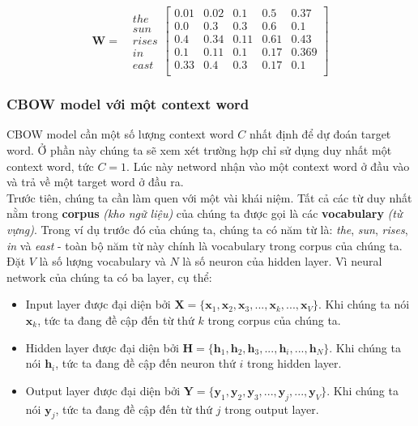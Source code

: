 \documentclass[12pt]{article}
\newcommand{\itemsizePaddingLeft}{\setlength{\itemindent}{0.6cm}}
\begin{document}
$$\boldsymbol{W} = \text{ } \begin{matrix} the \\ sun \\ rises \\ in \\ east \end{matrix} \begin{bmatrix} 0.01 & 0.02 & 0.1 & 0.5 & 0.37 \\ 0.0 & 0.3 & 0.3 & 0.6 & 0.1 \\ 0.4 & 0.34 & 0.11 & 0.61 & 0.43 \\ 0.1 & 0.11 & 0.1 & 0.17 & 0.369 \\ 0.33 & 0.4 & 0.3 & 0.17 & 0.1 \\ \end{bmatrix}$$

\subsubsection{CBOW model với một context word}
CBOW model cần một số lượng context word $C$ nhất định để dự đoán target word. Ở phần này chúng ta sẽ xem xét trường hợp chỉ sử dụng duy nhất một context word, tức $C = 1$. Lúc này netword nhận vào một context word ở đầu vào và trả về một target word ở đầu ra.\\

\indent Trước tiên, chúng ta cần làm quen với một vài khái niệm. Tất cả các từ duy nhất nằm trong \textbf{corpus} \textit{(kho ngữ liệu)} của chúng ta được gọi là các \textbf{vocabulary} \textit{(từ vựng)}. Trong ví dụ trước đó của chúng ta, chúng ta có năm từ là: \textsl{the}, \textsl{sun}, \textsl{rises}, \textsl{in} và \textsl{east} - toàn bộ năm từ này chính là vocabulary trong corpus của chúng ta.\\

\indent Đặt $V$ là số lượng vocabulary và $N$ là số neuron của hidden layer. Vì neural network của chúng ta có ba layer, cụ thể:
\begin{itemize}
  \itemsizePaddingLeft
  \item Input layer được đại diện bởi $\boldsymbol{X} = \{\boldsymbol{x}_1,\boldsymbol{x}_2,\boldsymbol{x}_3,...,\boldsymbol{x}_k,...,\boldsymbol{x}_V \}$. Khi chúng ta nói $\boldsymbol{x}_k$, tức ta đang đề cập đến từ thứ $k$ trong corpus của chúng ta.
  \item Hidden layer được đại diện bởi $\boldsymbol{H} = \{\boldsymbol{h}_1,\boldsymbol{h}_2,\boldsymbol{h}_3,...,\boldsymbol{h}_i,...,\boldsymbol{h}_N \}$. Khi chúng ta nói $\boldsymbol{h}_i$, tức ta đang đề cập đến neuron thứ $i$ trong hidden layer.
  \item Output layer được đại diện bởi $\boldsymbol{Y} = \{\boldsymbol{y}_1,\boldsymbol{y}_2,\boldsymbol{y}_3,...,\boldsymbol{y}_j,...,\boldsymbol{y}_V \}$. Khi chúng ta nói $\boldsymbol{y}_j$, tức ta đang đề cập đến từ thứ $j$ trong output layer.
\end{itemize}
\end{document}

